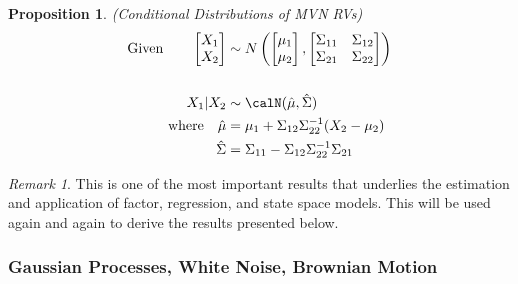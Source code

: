\documentclass[12pt]{article}
\theoremstyle{plain}
\newtheorem{prop}[thm]{Proposition}
\theoremstyle{definition}
\theoremstyle{remark}
\newtheorem*{rmk}{Remark}
\begin{document}
\begin{prop}\emph{(Conditional Distributions of MVN RVs)}
\begin{align}
  \text{Given} \qquad
    \begin{bmatrix} X_1 \\ X_2 \end{bmatrix}
    &\sim
    N\left(
    \begin{bmatrix} \mu_1 \\ \mu_2 \end{bmatrix},
    \begin{bmatrix}
      \Sigma_{11} & \Sigma_{12} \\
      \Sigma_{21} & \Sigma_{22}
    \end{bmatrix}
    \right) \notag\\
    \label{reg} \\
  X_1 | X_2 &\sim \calN(\hat{\mu}, \hat{\Sigma})  \notag\\
  \text{where} \quad
  \hat{\mu} &= \mu_1 + \Sigma_{12} \Sigma^{-1}_{22}
    (X_2-\mu_2) \notag\\
  \hat{\Sigma} &= \Sigma_{11} - \Sigma_{12} \Sigma^{-1}_{22}
    \Sigma_{21}\notag
\end{align}
\end{prop}
\begin{rmk}
This is one of the most important results that underlies the estimation
and application of factor, regression, and state space models.
This will be used again and again to derive the results presented below.
\end{rmk}

\clearpage
\subsubsection{Gaussian Processes, White Noise, Brownian Motion}
\end{document}
